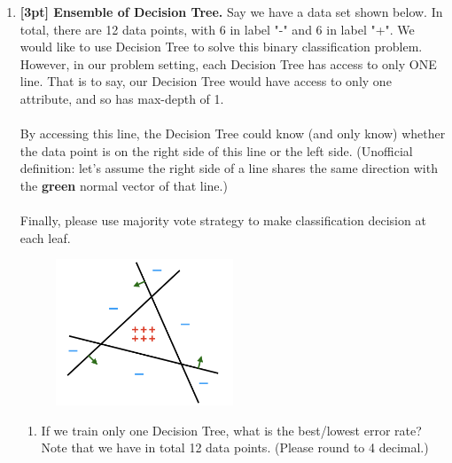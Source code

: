\begin{enumerate}
    \item \textbf{[3pt] Ensemble of Decision Tree.} Say we have a data set shown below. In total, there are 12 data points, with 6 in label "-" and 6 in label "+". We would like to use Decision Tree to solve this binary classification problem. However, in our problem setting, each Decision Tree has access to only ONE line. That is to say, our Decision Tree would have access to only one attribute, and so has max-depth of 1. \\ \\
    By accessing this line, the Decision Tree could know (and only know) whether the data point is on the right side of this line or the left side. (Unofficial definition: let's assume the right side of a line shares the same direction with the \textcolor{OliveGreen}{\textbf{green}} normal vector of that line.) \\ \\
    Finally, please use majority vote strategy to make classification decision at each leaf.\\
    
    \begin{figure}[H]
        \centering
        \includegraphics[width = 0.5\textwidth]{ensemble_dt.png}
        \label{Q_ensemble_DT}
    \end{figure}
    
    \begin{enumerate}
        \item  If we train only one Decision Tree, what is the best/lowest error rate? Note that we have in total 12 data points. (Please round to 4 decimal.) \\ \\
    \begin{tcolorbox}[fit,height=1cm, width=15cm, blank, borderline={1pt}{-2pt}, nobeforeafter]
    \end{tcolorbox} 
    
    


\end{enumerate}
\end{enumerate}
